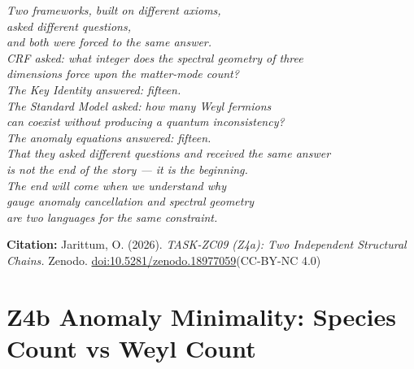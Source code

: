 \documentclass[12pt, a4paper]{article}
\begin{document}
\bigskip
\begin{center}
\textit{
Two frameworks, built on different axioms,\\
asked different questions,\\
and both were forced to the same answer.\\[0.5em]
CRF asked: what integer does the spectral geometry of three\\
dimensions force upon the matter-mode count?\\
The Key Identity answered: fifteen.\\[0.5em]
The Standard Model asked: how many Weyl fermions\\
can coexist without producing a quantum inconsistency?\\
The anomaly equations answered: fifteen.\\[0.5em]
That they asked different questions and received the same answer\\
is not the end of the story --- it is the beginning.\\
The end will come when we understand why\\
gauge anomaly cancellation and spectral geometry\\
are two languages for the same constraint.
}
\end{center}

\medskip
\begin{center}
\textbf{Citation:} Jarittum, O. (2026).
\textit{TASK-ZC09 (Z4a): Two Independent Structural Chains.}
Zenodo. \href{https://doi.org/10.5281/zenodo.18977059}%
{doi:10.5281/zenodo.18977059}\quad (CC-BY-NC 4.0)
\end{center}

\bigskip


\section{Z4b Anomaly Minimality: Species Count vs Weyl Count}
\label{sec:z4b-minimality}

\end{document}
